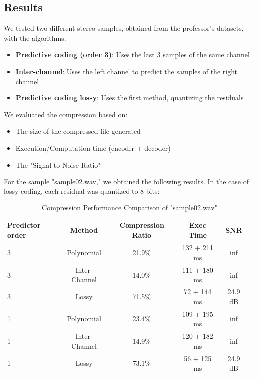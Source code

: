 \documentclass[a4paper,14pt]{article}
\begin{document}
\subsection{Results}
We tested two different stereo samples, obtained from the professor's datasets, with the algorithms:
\begin{itemize}
    \item \textbf{Predictive coding (order 3)}: Uses the last 3 samples of the same channel
    \item \textbf{Inter-channel}: Uses the left channel to predict the samples of the right channel
    \item \textbf{Predictive coding lossy}: Uses the first method, quantizing the residuals    
\end{itemize}

We evaluated the compression based on:
    \begin{itemize}
        \item The size of the compressed file generated
        \item Execution/Computation time (encoder + decoder)
        \item The "Signal-to-Noise Ratio"
    \end{itemize}


For the sample "sample02.wav," we obtained the following results. In the case of lossy coding, each residual was quantized to 8 bits:

\begin{table}[H]
\centering
\begin{tabular}{|l|c|c|c|c|c|}
\hline
\textbf{Predictor order} & \textbf{Method} & \textbf{Compression Ratio} & \textbf{Exec Time} & \textbf{SNR}\\
\hline
3 & Polynomial & 21.9\% & 132 + 211 ms & inf\\
3 & Inter-Channel & 14.0\% & 111 + 180 ms & inf\\
3 & Lossy & 71.5\% & 72 + 144 ms & 24.9 dB\\
\hline
1 & Polynomial & 23.4\% & 109 + 195 ms & inf\\ 
1 &Inter-Channel & 14.9\% & 120 + 182 ms & inf\\
1 & Lossy & 73.1\% & 56 + 125 ms & 24.9 dB\\
\hline
\end{tabular}
\caption{Compression Performance Comparison of "sample02.wav"}
\end{table}
\end{document}
